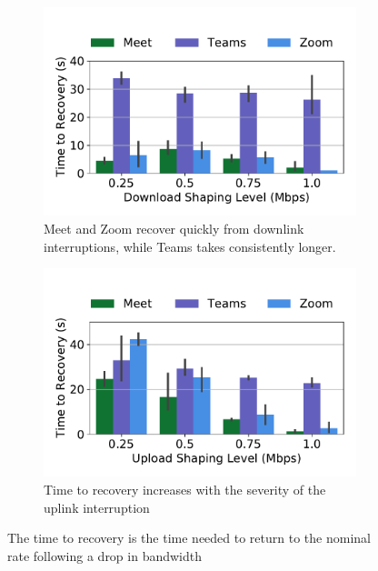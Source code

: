 \begin{figure}[ht]
\begin{subfigure}[t]{.5\textwidth}
  \centering
    \includegraphics[width=1\textwidth,keepaspectratio]{../figures/interrupt/TTR-dnld.pdf}
    \captionsetup{width=.9\linewidth}
    \caption{Meet and Zoom recover quickly from downlink interruptions, while Teams takes consistently longer.}
    \label{fig:TTR_dnld}
\end{subfigure}
\begin{subfigure}[t]{.5\textwidth}
  \centering
    \includegraphics[width=1\textwidth,keepaspectratio]{../figures/interrupt/TTR-upld.pdf}
    \captionsetup{width=.9\linewidth}
    \caption{Time to recovery increases with the severity of the uplink interruption}
    \label{fig:TTR_upld}
\end{subfigure}
\caption{The time to recovery is the time needed to return to the nominal rate following a drop in bandwidth}
\label{fig:TTR}
\end{figure}


